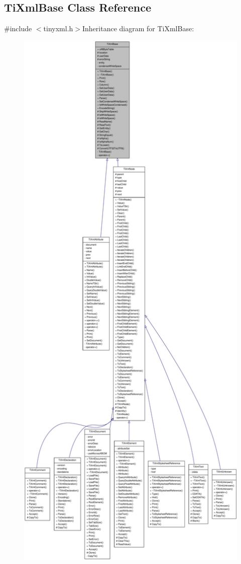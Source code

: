 \hypertarget{class_ti_xml_base}{
\subsection{TiXmlBase Class Reference}
\label{class_ti_xml_base}
}


{\ttfamily \#include $<$tinyxml.h$>$}Inheritance diagram for TiXmlBase:\nopagebreak
\begin{figure}[H]
\begin{center}
\leavevmode
\includegraphics[width=400pt]{class_ti_xml_base__inherit__graph}
\end{center}
\end{figure}
